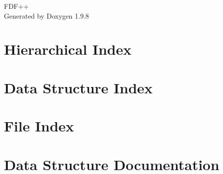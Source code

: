 \documentclass[twoside]{book}
\newcommand{\+}{\discretionary{\mbox{\scriptsize$\hookleftarrow$}}{}{}}
\newcommand{\clearemptydoublepage}{%
    \newpage{\pagestyle{empty}\cleardoublepage}%
  }
\begin{document}
  \raggedbottom
    \hypersetup{pageanchor=false,
                bookmarksnumbered=true,
                pdfencoding=unicode
               }
  \begin{titlepage}
  \vspace*{7cm}
  \begin{center}%
  {\Large FDF++}\\
  \vspace*{1cm}
  {\large Generated by Doxygen 1.9.8}\\
  \end{center}
  \end{titlepage}
  \clearemptydoublepage
  \tableofcontents
  \clearemptydoublepage
  \hypersetup{pageanchor=true}

\chapter{Hierarchical Index}

\chapter{Data Structure Index}

\chapter{File Index}

\chapter{Data Structure Documentation}






























\end{document}
